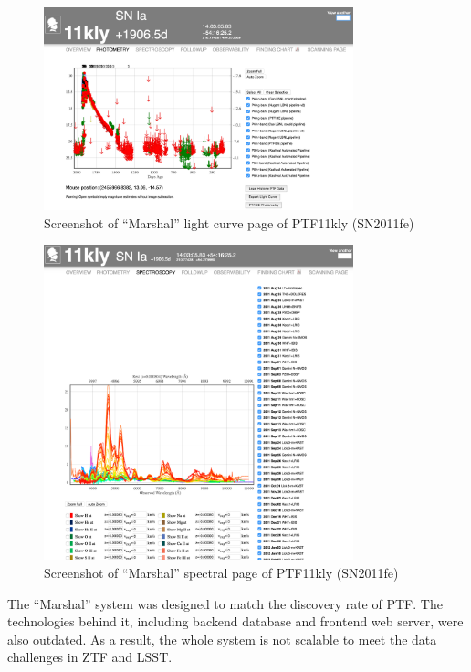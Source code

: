 \documentclass[11pt]{article}
\begin{document}
\begin{figure}[htb]
  \centering
  \includegraphics[width=0.8\textwidth]{plot_lc.png}
  \caption{Screenshot of ``Marshal'' light curve page of PTF11kly (SN2011fe)}
  \label{fig:sn2011fe_lc}
\end{figure}

\begin{figure}[htb]
  \centering
  \includegraphics[width=0.8\textwidth]{view_spec.png}  
  \caption{Screenshot of ``Marshal'' spectral page of PTF11kly (SN2011fe)}
  \label{fig:sn2011fe_spec}
\end{figure}

The ``Marshal'' system was designed to match the discovery rate of
PTF. The technologies behind it, including backend database and
frontend web server, were also outdated. As a result, the whole system
is not scalable to meet the data challenges in ZTF and LSST.
\end{document}
